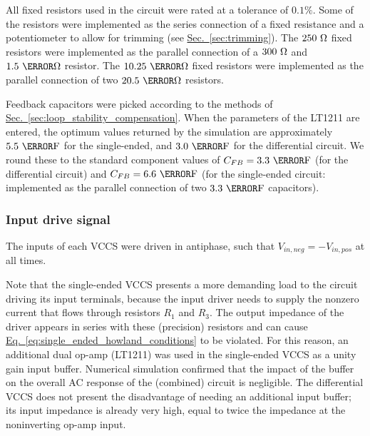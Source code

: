 \documentclass[10pt]{article}
\newcommand{\briefeqlink}[1]{\hyperref[#1]{Eq.~\ref*{#1}}\xspace }
\newcommand{\briefseclink}[1]{\hyperref[#1]{Sec.~\ref*{#1}}}
\begin{document}
All fixed resistors used in the circuit were rated at a tolerance of $0.1\%$. Some of the resistors were implemented as the series connection of a fixed resistance and a potentiometer to allow for trimming (see \briefseclink{sec:trimming}). The $250~\ohm$ fixed resistors were implemented as the parallel connection of a $300~\ohm$ and $1.5~\kilo\ohm$ resistor. The $10.25~\kilo\ohm$ fixed resistors were implemented as the parallel connection of two $20.5~\kilo\ohm$ resistors.

Feedback capacitors were picked according to the methods of \briefseclink{sec:loop_stability_compensation}. When the parameters of the LT1211 are entered, the optimum values returned by the simulation are approximately $5.5~\pico\farad$ for the single-ended, and $3.0~\pico\farad$ for the differential circuit. We round these to the standard component values of $C_{FB}=3.3~\pico\farad$ (for the differential circuit) and $C_{FB}=6.6~\pico\farad$ (for the single-ended circuit: implemented as the parallel connection of two $3.3~\pico\farad$ capacitors).


\subsubsection{Input drive signal}

The inputs of each VCCS were driven in antiphase, such that $V_{in,neg}=-V_{in,pos}$ at all times.

Note that the single-ended VCCS presents a more demanding load to the circuit driving its input terminals, because the input driver needs to supply the nonzero current that flows through resistors $R_1$ and $R_3$. The output impedance of the driver appears in series with these (precision) resistors and can cause \briefeqlink{eq:single_ended_howland_conditions} to be violated. For this reason, an additional dual op-amp (LT1211) was used in the single-ended VCCS as a unity gain input buffer. Numerical simulation confirmed that the impact of the buffer on the overall AC response of the (combined) circuit is negligible. The differential VCCS does not present the disadvantage of needing an additional input buffer; its input impedance is already very high, equal to twice the impedance at the noninverting op-amp input.
\end{document}
